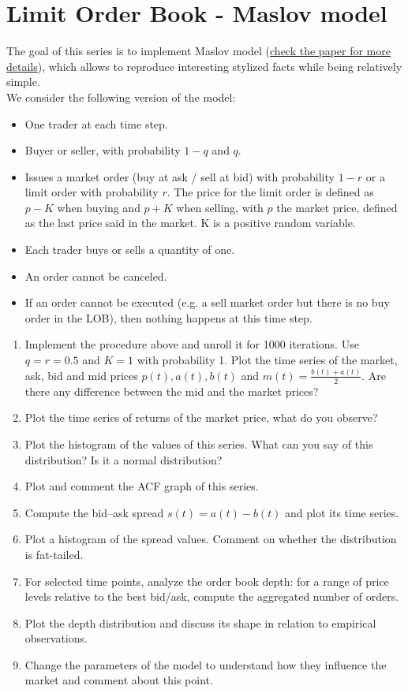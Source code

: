 \section*{Limit Order Book - Maslov model}
The goal of this series is to implement Maslov model (\href{https://arxiv.org/pdf/cond-mat/9910502.pdf}{check the paper for more details}), which allows to reproduce interesting stylized facts while being relatively simple. \\

\noindent We consider the following version of the model:

\begin{itemize}
    \item One trader at each time step.
    \item Buyer or seller, with probability $1 - q$ and $q$.
    \item Issues a market order (buy at ask / sell at bid) with probability $1 - r$ or a limit order with probability $r$. The price for the limit order is defined as $p - K$ when buying and $p + K$ when selling, with $p$ the market price, defined as the last price said in the market. K is a positive random variable.
    \item Each trader buys or sells a quantity of one.
    \item An order cannot be canceled.
    \item If an order cannot be executed (e.g. a sell market order but there is no buy order in the LOB), then nothing happens at this time step.
\end{itemize}

\begin{enumerate}
    \item Implement the procedure above and unroll it for 1000 iterations. Use $q = r = 0.5$ and $K = 1$ with probability 1. Plot the time series of the market, ask, bid and mid prices $p(t), a(t), b(t)$ and $ m(t) = \frac{b(t) + a(t)}{2}$. Are there any difference between the mid and the market prices? 
    \item Plot the time series of returns of the market price, what do you observe?
    \item Plot the histogram of the values of this series. What can you say of this distribution? Is it a normal distribution?
    \item Plot and comment the ACF graph of this series. 
     \item Compute the bid–ask spread $s(t)=a(t)-b(t)$ and plot its time series.
    \item Plot a histogram of the spread values. Comment on whether the distribution is fat-tailed.
    \item For selected time points, analyze the order book depth: for a range of price levels relative to the best bid/ask, compute the aggregated number of orders.
    \item Plot the depth distribution and discuss its shape in relation to empirical observations.
    \item Change the parameters of the model to understand how they influence the market and comment about this point.
\end{enumerate}

